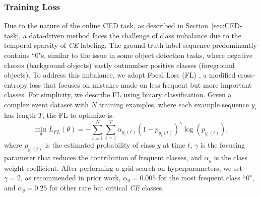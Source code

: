 \subsubsection{Training Loss}
Due to the nature of the online CED task, as described in Section~\ref{sec:CED-task}, a data-driven method faces the challenge of class imbalance due to the temporal sparsity of \emph{CE} labeling. The ground-truth label sequence predominantly contains ``0"s, similar to the issue in some object detection tasks, where negative classes (background objects) vastly outnumber positive classes (foreground objects). To address this imbalance, we adopt Focal Loss (FL) \cite{DBLP:journals/corr/abs-1708-02002}, a modified cross-entropy loss that focuses on mistakes made on less frequent but more important classes. For simplicity, we describe FL using binary classification. Given a complex event dataset with $N$ training examples, where each example sequence $y_i$ has length $T$, the FL to optimize is:
\vspace{-1em}
\begin{equation}
\min_\theta L_{FL}\left(\theta\right)=-\sum_{i=1}^{N}\sum_{t=1}^{T}\alpha_{y_i(t)}\left(1-p_{y_i(t)}\right)^\gamma \log \left(p_{y_i(t)}\right),
\label{eq:fl}
\end{equation}
where $p_{y_i(t)}$ is the estimated probability of class $y$ at time $t$, $\gamma$ is the focusing parameter that reduces the contribution of frequent classes, and $\alpha_y$ is the class weight coefficient. After performing a grid search on hyperparameters, we set $\gamma = 2$, as recommended in prior work, $\alpha_0 = 0.005$ for the most frequent class ``0", and $\alpha_y = 0.25$ for other rare but critical \emph{CE} classes. 


